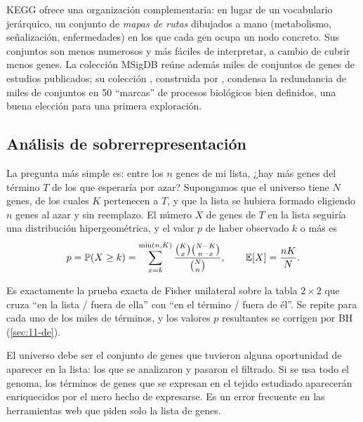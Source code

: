 KEGG \parencite{c11-kanehisa2000} ofrece una organización complementaria: en lugar de un vocabulario jerárquico, un conjunto de \emph{mapas de rutas} dibujados a mano (metabolismo, señalización, enfermedades) en los que cada gen ocupa un nodo concreto. Sus conjuntos son menos numerosos y más fáciles de interpretar, a cambio de cubrir menos genes. La colección MSigDB reúne además miles de conjuntos de genes de estudios publicados; su colección , construida por \textcite{c11-liberzon2015}, condensa la redundancia de miles de conjuntos en 50 ``marcas'' de procesos biológicos bien definidos, una buena elección para una primera exploración.

\subsection{Análisis de sobrerrepresentación}

La pregunta más simple es: entre los $n$ genes de mi lista, ¿hay más genes del término $T$ de los que esperaría por azar? Supongamos que el universo tiene $N$ genes, de los cuales $K$ pertenecen a $T$, y que la lista se hubiera formado eligiendo $n$ genes al azar y sin reemplazo. El número $X$ de genes de $T$ en la lista seguiría una distribución hipergeométrica, y el valor $p$ de haber observado $k$ o más es
\begin{equation}\label{eq:11-hiper}
p=\mathbb{P}(X\ge k)=\sum_{x=k}^{\min(n,K)}\frac{\binom{K}{x}\binom{N-K}{n-x}}{\binom{N}{n}},\qquad \mathbb{E}[X]=\frac{nK}{N}.
\end{equation}

\begin{simbolos}
\end{simbolos}

Es exactamente la prueba exacta de Fisher unilateral sobre la tabla $2\times2$ que cruza ``en la lista / fuera de ella'' con ``en el término / fuera de él''. Se repite para cada uno de los miles de términos, y los valores $p$ resultantes se corrigen por BH (\cref{sec:11-de}).

\begin{cuidado}
El universo debe ser el conjunto de genes que tuvieron alguna oportunidad de aparecer en la lista: los que se analizaron y pasaron el filtrado. Si se usa todo el genoma, los términos de genes que se expresan en el tejido estudiado aparecerán enriquecidos por el mero hecho de expresarse. Es un error frecuente en las herramientas web que piden solo la lista de genes.
\end{cuidado}

